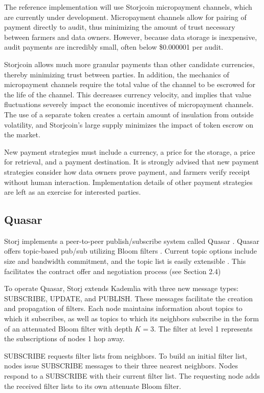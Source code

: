 \documentclass[a4paper,10pt]{article}
\begin{document}
The reference implementation will use Storjcoin micropayment channels, which are currently under development. Micropayment channels allow for pairing of payment directly to audit, thus minimizing the amount of trust necessary between farmers and data owners. However, because data storage is inexpensive, audit payments are incredibly small, often below \$0.000001 per audit.

Storjcoin allows much more granular payments than other candidate currencies, thereby minimizing trust between parties. In addition, the mechanics of micropayment channels require the total value of the channel to be escrowed for the life of the channel. This decreases currency velocity, and implies that value fluctuations severely impact the economic incentives of micropayment channels. The use of a separate token creates a certain amount of insulation from outside volatility, and Storjcoin's large supply minimizes the impact of token escrow on the market.

New payment strategies must include a currency, a price for the storage, a price for retrieval, and a payment destination. It is strongly advised that new payment strategies consider how data owners prove payment, and farmers verify receipt without human interaction. Implementation details of other payment strategies are left as an exercise for interested parties.

\subsection{Quasar}
Storj implements a peer-to-peer publish/subscribe system called Quasar \cite{8}\cite{9}. Quasar offers topic-based pub/sub utilizing Bloom filters \cite{10}. Current topic options include size and bandwidth commitment, and the topic list is easily extensible \cite{11}. This facilitates the contract offer and negotiation process (see Section 2.4)

To operate Quasar, Storj extends Kademlia with three new message types: SUBSCRIBE, UPDATE, and PUBLISH. These messages facilitate the creation and propagation of filters. Each node maintains information about topics to which it subscribes, as well as topics to which its neighbors subscribe in the form of an attenuated Bloom filter with depth $ K = 3 $. The filter at level 1 represents the subscriptions of nodes 1 hop away.

SUBSCRIBE requests filter lists from neighbors. To build an initial filter list, nodes issue SUBSCRIBE messages to their three nearest neighbors. Nodes respond to a SUBSCRIBE with their current filter list. The requesting node adds the received filter lists to its own attenuate Bloom filter.
\end{document}
